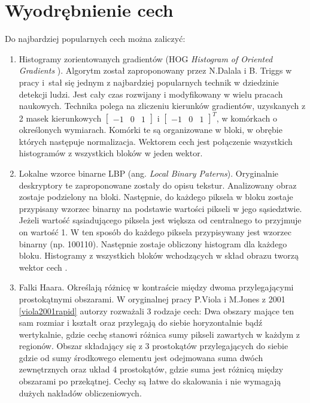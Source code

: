 
\section{Wyodrębnienie cech}

Do najbardziej popularnych cech można zaliczyć:

\begin{enumerate}
\item Histogramy zorientowanych gradientów (HOG \textit{Histogram of Oriented Gradients }). %
Algorytm został zaproponowany przez N.Dalala i B. Triggs w pracy \cite{dalal2005histograms} i~stał się jednym z najbardziej popularnych technik w dziedzinie detekcji ludzi. %
Jest cały czas rozwijany i modyfikowany w wielu pracach naukowych.
Technika polega na zliczeniu kierunków gradientów, uzyskanych z 2 masek kierunkowych \(\begin{bmatrix}-1 & 0 & 1\end{bmatrix} \) i \( \begin{bmatrix}-1 & 0 & 1 \end{bmatrix}^T\), w komórkach o określonych wymiarach. 
Komórki te są organizowane w bloki, w obrębie których następuje normalizacja. 
Wektorem cech jest połączenie wszystkich histogramów z wszystkich bloków w jeden wektor.


\item Lokalne wzorce binarne LBP (ang. \textit{Local Binary Paterns}).
Oryginalnie deskryptory te zaproponowane zostały do opisu tekstur. %
Analizowany obraz zostaje podzielony na bloki. 
Następnie, do każdego piksela w bloku zostaje przypisany wzorzec binarny na podstawie wartości pikseli w jego sąsiedztwie. 
Jeżeli wartość sąsiadującego piksela jest większa od centralnego to przyjmuje on wartość 1. W ten sposób do każdego piksela przypisywany jest wzorzec binarny (np. 100110).
Następnie zostaje obliczony histogram dla każdego bloku. 
Histogramy z wszystkich bloków wchodzących w skład obrazu tworzą wektor cech \cite{ojala2002multiresolution}.

\item Falki Haara.
Określają różnicę w kontraście między dwoma przylegającymi prostokątnymi obszarami. W oryginalnej pracy P.Viola i M.Jones z 2001 \ref{viola2001rapid} autorzy rozważali 3 rodzaje cech: Dwa obszary mające ten sam rozmiar i kształt oraz przylegają do siebie horyzontalnie bądź wertykalnie, gdzie cechę stanowi różnica sumy pikseli zawartych w każdym z regionów. Obszar składający się z 3 prostokątów przylegających do siebie gdzie od sumy środkowego elementu jest odejmowana suma dwóch zewnętrznych oraz układ 4 prostokątów, gdzie suma jest różnicą między obszarami po przekątnej.
Cechy są łatwe do skalowania i nie wymagają dużych nakładów obliczeniowych. 


\end{enumerate}
